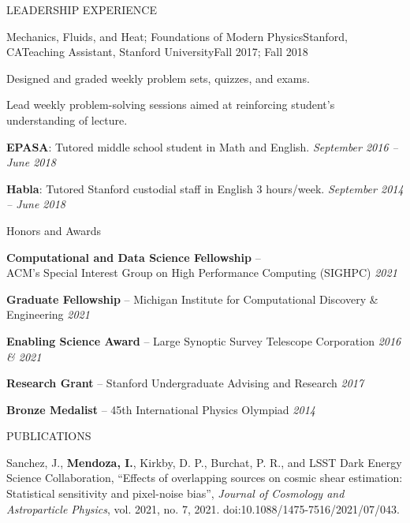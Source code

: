 \documentclass{resume} %
\begin{document}
\begin{rSection}{LEADERSHIP EXPERIENCE}
\begin{rSubsection}{Mechanics, Fluids, and Heat; Foundations of Modern Physics}{Stanford, CA}{Teaching Assistant, Stanford University}{Fall 2017; Fall 2018}
\item Designed and graded weekly problem sets, quizzes, and exams. 
\item Lead weekly problem-solving sessions aimed at reinforcing student's understanding of lecture. 
%
\end{rSubsection} 
%
\textbf{EPASA}: Tutored middle school student in Math and English. \hfill {\em September 2016 -- June 2018}

\vspace*{-.15cm}
\textbf{Habla}: Tutored Stanford custodial staff in English 3 hours/week. \hfill {\em September 2014 -- June 2018}
\end{rSection}


\begin{rSection}{Honors and Awards} \itemsep -3pt \vspace*{-.25cm}

\item \textbf{Computational and Data Science Fellowship} -- \\ ACM’s Special Interest Group on High Performance Computing (SIGHPC) \hfill {\em 2021}

\item \textbf{Graduate Fellowship} -- Michigan Institute for Computational Discovery \& Engineering  \hfill {\em 2021}

\item \textbf{Enabling Science Award} -- Large Synoptic Survey Telescope Corporation \hfill {\em 2016 \& 2021}

\item \textbf{Research Grant} -- Stanford Undergraduate Advising and Research \hfill {\em 2017}

\item \textbf{Bronze Medalist} -- 45th International Physics Olympiad \hfill {\em 2014}
\end{rSection}


\begin{rSection}{PUBLICATIONS}
%
\vspace*{-1em}
\item Sanchez, J., \textbf{Mendoza, I.}, Kirkby, D. P., Burchat, P. R., and LSST Dark Energy Science Collaboration, “Effects of overlapping sources on cosmic shear estimation: Statistical sensitivity and pixel-noise bias”, \textit{Journal of Cosmology and Astroparticle Physics}, vol. 2021, no. 7, 2021. doi:10.1088/1475-7516/2021/07/043.
%
\end{rSection}
\end{document}
